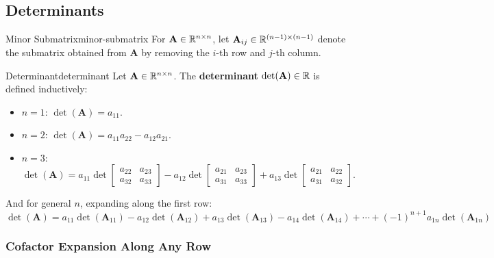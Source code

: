 \subsection{Determinants}

\begin{definition}{Minor Submatrix}{minor-submatrix}
  For $\mathbf{A} \in \mathbb{R}^{n \times n}$, let $\mathbf{A}_{ij} \in \mathbb{R}^{(n-1) \times (n-1)}$ denote the submatrix obtained from $\mathbf{A}$ by removing the $i$-th row and $j$-th column.
\end{definition}

\begin{definition}{Determinant}{determinant}
  Let $\mathbf{A} \in \mathbb{R}^{n \times n}$. The \textbf{determinant} $\det(\mathbf{A}) \in \mathbb{R}$ is defined inductively:
  \begin{itemize}
    \item $n = 1$: $\det(\mathbf{A}) = a_{11}$.
    \item $n = 2$: $\det(\mathbf{A}) = a_{11} a_{22} - a_{12} a_{21}$.
    \item $n = 3$:
          \[
            \det(\mathbf{A})
            = a_{11} \det
            \begin{bmatrix}
              a_{22} & a_{23} \\ a_{32} & a_{33}
            \end{bmatrix}
            - a_{12} \det
            \begin{bmatrix}
              a_{21} & a_{23} \\ a_{31} & a_{33}
            \end{bmatrix}
            + a_{13} \det
            \begin{bmatrix}
              a_{21} & a_{22} \\ a_{31} & a_{32}
            \end{bmatrix}
            .
          \]
  \end{itemize}

  And for general $n$, expanding along the first row:
  \[
    \det(\mathbf{A})
    = a_{11} \det(\mathbf{A}_{11})
    - a_{12} \det(\mathbf{A}_{12})
    + a_{13} \det(\mathbf{A}_{13})
    - a_{14} \det(\mathbf{A}_{14})
    + \cdots
    + (-1)^{n+1} a_{1n} \det(\mathbf{A}_{1n})
  \]

\end{definition}

\subsubsection{Cofactor Expansion Along Any Row}

